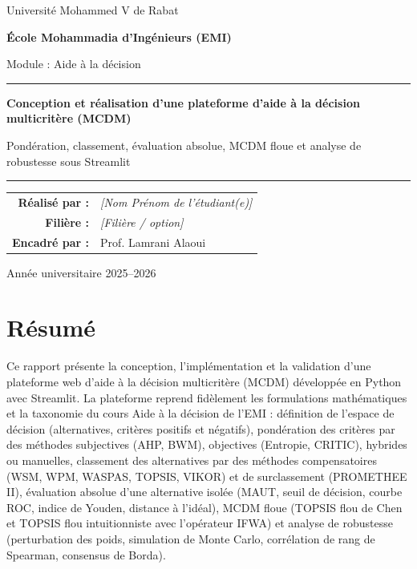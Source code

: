 \documentclass[11pt,a4paper]{report}
\newcommand{\auteurs}{\textit{[Nom Prénom de l'étudiant(e)]}}
\newcommand{\filiere}{\textit{[Filière / option]}}
\newcommand{\annee}{2025--2026}
\theoremstyle{definition}
\theoremstyle{remark}
\begin{document}
\begin{titlepage}
  \centering
  {\large Université Mohammed V de Rabat\par}
  {\Large\bfseries École Mohammadia d'Ingénieurs (EMI)\par}
  \vspace{0.6cm}
  {\large Module : Aide à la décision\par}
  \vspace{2.5cm}
  {\color{emiblue}\rule{\linewidth}{1.2pt}\par}
  \vspace{0.4cm}
  {\Huge\bfseries Conception et réalisation d'une plateforme d'aide à la décision multicritère (MCDM)\par}
  \vspace{0.4cm}
  {\Large Pondération, classement, évaluation absolue, MCDM floue et analyse de robustesse sous Streamlit\par}
  \vspace{0.4cm}
  {\color{emiblue}\rule{\linewidth}{1.2pt}\par}
  \vspace{2.5cm}
  \begin{tabular}{rl}
    \textbf{Réalisé par :} & \auteurs \\
    \textbf{Filière :} & \filiere \\
    \textbf{Encadré par :} & Prof. Lamrani Alaoui \\
  \end{tabular}
  \vfill
  {\large Année universitaire \annee\par}
\end{titlepage}

\chapter*{Résumé}

Ce rapport présente la conception, l'implémentation et la validation d'une plateforme web d'aide à la
décision multicritère (MCDM) développée en Python avec Streamlit. La plateforme reprend fidèlement les
formulations mathématiques et la taxonomie du cours \og Aide à la décision \fg{} de l'EMI : définition de
l'espace de décision (alternatives, critères positifs et négatifs), pondération des critères par des
méthodes subjectives (AHP, BWM), objectives (Entropie, CRITIC), hybrides ou manuelles, classement des
alternatives par des méthodes compensatoires (WSM, WPM, WASPAS, TOPSIS, VIKOR) et de surclassement
(PROMETHEE II), évaluation absolue d'une alternative isolée (MAUT, seuil de décision, courbe ROC, indice de
Youden, distance à l'idéal), MCDM floue (TOPSIS flou de Chen et TOPSIS flou intuitionniste avec
l'opérateur IFWA) et analyse de robustesse (perturbation des poids, simulation de Monte Carlo, corrélation
de rang de Spearman, consensus de Borda).
\end{document}
